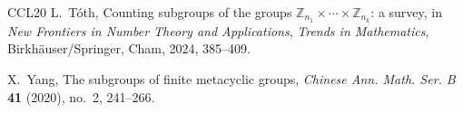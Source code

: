 \documentclass[a4paper,11pt,reqno]{amsart}
\theoremstyle{plain}
\theoremstyle{remark}
\numberwithin{equation}{section}
\begin{document}
\begin{thebibliography}{CCL20}
L.~T\'oth,
Counting subgroups of the groups $\mathbb Z_{n_1}\times\cdots\times\mathbb Z_{n_k}$: a survey,
in \emph{New Frontiers in Number Theory and Applications},
\emph{Trends in Mathematics}, Birkh\"auser/Springer, Cham, 2024, 385--409.

X.~Yang,
The subgroups of finite metacyclic groups,
\emph{Chinese Ann. Math. Ser. B} \textbf{41} (2020), no.~2, 241--266.

\end{thebibliography}
\end{document}
